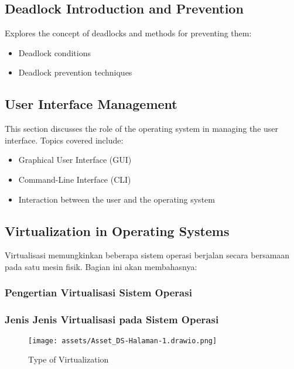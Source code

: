 \documentclass[12pt]{article}
\begin{document}
\subsection{Deadlock Introduction and Prevention}
Explores the concept of deadlocks and methods for preventing them:
\begin{itemize}
    \item Deadlock conditions
    \item Deadlock prevention techniques
\end{itemize}

\subsection{User Interface Management}
This section discusses the role of the operating system in managing the user interface. Topics covered include:
\begin{itemize}
    \item Graphical User Interface (GUI)
    \item Command-Line Interface (CLI)
    \item Interaction between the user and the operating system
\end{itemize}

\subsection{Virtualization in Operating Systems}
Virtualisasi memungkinkan beberapa sistem operasi berjalan secara bersamaan pada satu mesin fisik. Bagian ini akan membahasnya:
    
\subsubsection{Pengertian Virtualisasi Sistem Operasi}

\subsubsection{Jenis Jenis Virtualisasi pada Sistem Operasi}

\begin{figure}[h!]
    \centering
    \texttt{[image: assets/Asset\_DS-Halaman-1.drawio.png]}
    \caption{Type of Virtualization}
\end{figure}
\end{document}
